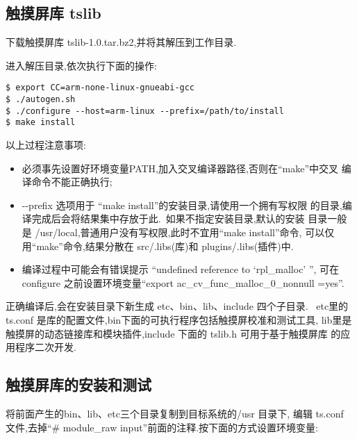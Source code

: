 \subsection{触摸屏库 tslib}
	下载触摸屏库 tslib-1.0.tar.bz2,并将其解压到工作目录.

	进入解压目录,依次执行下面的操作:

\begin{boxedminipage}{.9\textwidth}
\begin{verbatim}
$ export CC=arm-none-linux-gnueabi-gcc
$ ./autogen.sh
$ ./configure --host=arm-linux --prefix=/path/to/install
$ make install
\end{verbatim}
\end{boxedminipage}

	以上过程注意事项:
\begin{itemize}
  \item 必须事先设置好环境变量PATH,加入交叉编译器路径,否则在``make''中交叉
	编译命令不能正确执行;
  \item -{}-prefix 选项用于 ``make install''的安装目录,请使用一个拥有写权限
	的目录,编译完成后会将结果集中存放于此.~如果不指定安装目录,默认的安装
	目录一般是 /usr/local,普通用户没有写权限,此时不宜用``make install''命令,
	可以仅用``make''命令,结果分散在 src/.libs(库)和 plugins/.libs(插件)中.
  \item 编译过程中可能会有错误提示 ``undefined reference to `rpl\_malloc' '',
	可在 configure 之前设置环境变量``export ac\_cv\_func\_malloc\_0\_nonnull
	=yes''.
\end{itemize}

	正确编译后,会在安装目录下新生成 etc、bin、lib、include 四个子目录.
~etc里的 ts.conf 是库的配置文件,bin下面的可执行程序包括触摸屏校准和测试工具,
lib里是触摸屏的动态链接库和模块插件,include 下面的 tslib.h 可用于基于触摸屏库
的应用程序二次开发.

\subsection{触摸屏库的安装和测试}
	将前面产生的bin、lib、etc三个目录复制到目标系统的/usr 目录下, 编辑 ts.conf
文件,去掉``\# module\_raw input''前面的注释.按下面的方式设置环境变量:

